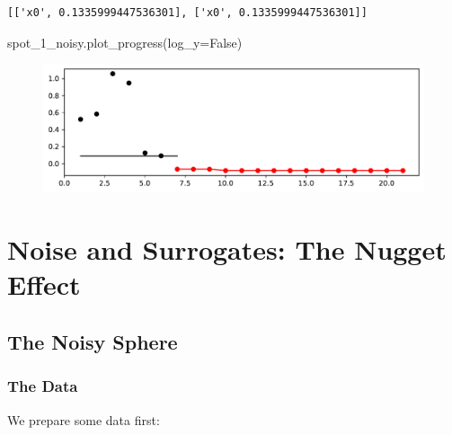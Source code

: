 \documentclass[
  letterpaper,
  DIV=11,
  numbers=noendperiod]{scrreprt}
\newenvironment{Shaded}{\begin{snugshade}}{\end{snugshade}}
\newcommand{\NormalTok}[1]{\textcolor[rgb]{0.00,0.23,0.31}{#1}}
\newcommand{\OperatorTok}[1]{\textcolor[rgb]{0.37,0.37,0.37}{#1}}
\newcommand{\VariableTok}[1]{\textcolor[rgb]{0.07,0.07,0.07}{#1}}
\begin{document}
\begin{verbatim}
[['x0', 0.1335999447536301], ['x0', 0.1335999447536301]]
\end{verbatim}

\begin{Shaded}
\begin{Highlighting}[]
\NormalTok{spot\_1\_noisy.plot\_progress(log\_y}\OperatorTok{=}\VariableTok{False}\NormalTok{)}
\end{Highlighting}
\end{Shaded}

\begin{figure}[H]

{\centering \includegraphics{09_spot_ocba_files/figure-pdf/cell-8-output-1.pdf}

}

\end{figure}

\hypertarget{noise-and-surrogates-the-nugget-effect-1}{%
\section{Noise and Surrogates: The Nugget
Effect}\label{noise-and-surrogates-the-nugget-effect-1}}

\hypertarget{the-noisy-sphere-1}{%
\subsection{The Noisy Sphere}\label{the-noisy-sphere-1}}

\hypertarget{the-data-1}{%
\subsubsection{The Data}\label{the-data-1}}

We prepare some data first:
\end{document}
